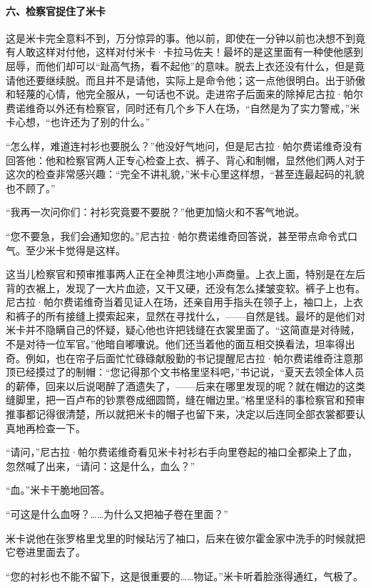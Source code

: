 \paragraph*{六、检察官捉住了米卡}
\par 这是米卡完全意料不到，万分惊异的事。他以前，即使在一分钟以前也决想不到竟有人敢这样对付他，这样对付米卡·卡拉马佐夫！最坏的是这里面有一种使他感到屈辱，而他们却可以“趾高气扬，看不起他”的意味。脱去上衣还没有什么，但是竟请他还要继续脱。而且并不是请他，实际上是命令他；这一点他很明白。出于骄傲和轻蔑的心情，他完全服从，一句话也不说。走进帘子后面来的除掉尼古拉·帕尔费诺维奇以外还有检察官，同时还有几个乡下人在场，“自然是为了实力警戒，”米卡心想，“也许还为了别的什么。”
\par “怎么样，难道连衬衫也要脱么？”他没好气地问，但是尼古拉·帕尔费诺维奇没有回答他：他和检察官两人正专心检查上衣、裤子、背心和制帽，显然他们两人对于这次的检查非常感兴趣：“完全不讲礼貌，”米卡心里这样想，“甚至连最起码的礼貌也不顾了。”
\par “我再一次问你们：衬衫究竟要不要脱？”他更加恼火和不客气地说。
\par “您不要急，我们会通知您的。”尼古拉·帕尔费诺维奇回答说，甚至带点命令式口气。至少米卡觉得是这样。
\par 这当儿检察官和预审推事两人正在全神贯注地小声商量。上衣上面，特别是在左后背的衣裾上，发现了一大片血迹，又干又硬，还没有怎么揉皱变软。裤子上也有。尼古拉·帕尔费诺维奇当着见证人在场，还亲自用手指头在领子上，袖口上，上衣和裤子的所有接缝上摸索起来，显然在寻找什么，——自然是钱。最坏的是他们对米卡并不隐瞒自己的怀疑，疑心他也许把钱缝在衣裳里面了。“这简直是对待贼，不是对待一位军官。”他暗自嘟囔说。他们还当着他的面互相交换看法，坦率得出奇。例如，也在帘子后面忙忙碌碌献殷勤的书记提醒尼古拉·帕尔费诺维奇注意那顶已经摸过了的制帽：“您记得那个文书格里坚科吧，”书记说，“夏天去领全体人员的薪俸，回来以后说喝醉了酒遗失了，——后来在哪里发现的呢？就在帽边的这类缝脚里，把一百卢布的钞票卷成细圆筒，缝在帽边里。”格里坚科的事检察官和预审推事都记得很清楚，所以就把米卡的帽子也留下来，决定以后连同全部衣裳都要认真地再检查一下。
\par “请问，”尼古拉·帕尔费诺维奇看见米卡衬衫右手向里卷起的袖口全都染上了血，忽然喊了出来，“请问：这是什么，血么？”
\par “血。”米卡干脆地回答。
\par “可这是什么血呀？……为什么又把袖子卷在里面？”
\par 米卡说他在张罗格里戈里的时候玷污了袖口，后来在彼尔霍金家中洗手的时候就把它卷进里面去了。
\par “您的衬衫也不能不留下，这是很重要的……物证。”米卡听着脸涨得通红，气极了。
